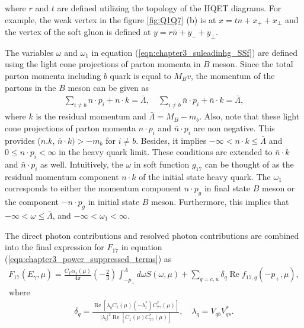 where $r$ and $t$ are defined utilizing the topology of the HQET diagrams. For example, the weak vertex in the figure \ref{fig:Q1Q7} (b) is at $x=t n+x_{+}+x_{\perp}$ and the vertex of the soft gluon is defined at $y=r \bar{n}+y_{-}+y_{\perp}$. \par
The variables $\omega$ and $\omega_1$ in equation (\ref{eqn:chapter3_suleadinhg_SSf}) are defined using the light cone projections of parton momenta in $B$ meson. Since the total parton momenta including $b$ quark is equal to $M_B v$, the momentum of the partons in the $B$ meson can be given as 
\begin{eqnarray}
\sum_{i \neq b} n \cdot p_{i}+n \cdot k=\bar{\Lambda}, \quad \sum_{i \neq b} \bar{n} \cdot p_{i}+\bar{n} \cdot k=\bar{\Lambda},
\end{eqnarray}
where $k$ is the residual momentum and $\bar{\Lambda}= M_B-m_b$. Also, note that these light cone projections of parton momenta $n\cdot p_i$ and $\bar{n}\cdot p_i$ are non negative. This provides ($n.k$, $\bar{n}\cdot k)>-m_b$ for $i\neq b$. Besides, it implies $-\infty < n\cdot k\leq\bar{\Lambda}$ and $0 \leq n \cdot p_{i}<\infty$ in the heavy quark limit. These conditions are extended to $\bar{n}\cdot k$ and $\bar{n}\cdot p_i$ as well. Intuitively, the $\omega$ in soft function $g_{17}$ can be thought of as the residual momentum component $n\cdot k$ of the initial state heavy quark. The $\omega_1$ corresponds to either the momentum component $n\cdot p_g$ in final state $B$ meson or the component $-n\cdot p_g$ in initial state $B$ meson. Furthermore, this implies that $-\infty<\omega \leq \bar{\Lambda}$, and $-\infty<\omega_{1}<\infty$.
\par
The direct photon contributions and resolved photon contributions are combined into the final expression for $F_{17}$ in equation (\ref{eqn:chapter3_power_suppressed_terms}) as
\begin{eqnarray}\label{eqn:chapter3_F_17}
F_{17}\left(E_{\gamma}, \mu\right)=\frac{C_{F} \alpha_{s}(\mu)}{4 \pi}\left(-\frac{2}{3}\right) \int_{-p_{+}}^{\bar{\Lambda}} d \omega S(\omega, \mu)+\sum_{q=c, u} \delta_{q} \operatorname{Re} f_{17, q}\left(-p_{+}, \mu\right),
\end{eqnarray}\
where
\begin{eqnarray}
\delta_{q}=\frac{\operatorname{Re}\left[\lambda_{q} C_{1}(\mu)\left(-\lambda_{t}^{*}\right) C_{7 \gamma}^{*}(\mu)\right]}{\left|\lambda_{t}\right|^{2} \operatorname{Re}\left[C_{1}(\mu) C_{7 \gamma}^{*}(\mu)\right]}, \quad \lambda_{q}=V_{q b} V_{q s}^{*}.
\end{eqnarray}
